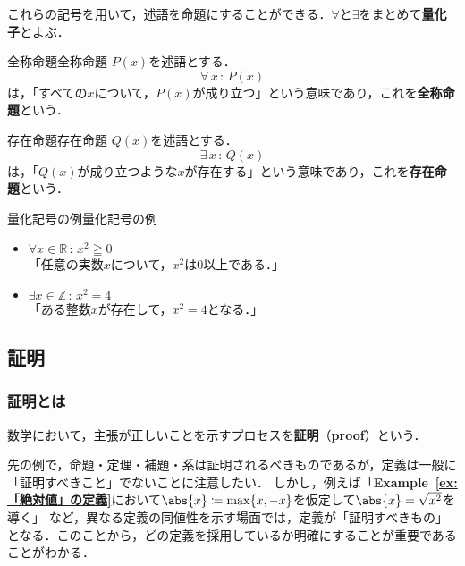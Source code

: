 \documentclass[a4paper,11pt]{ltjsarticle}
\renewcommand{\emph}[1]{\textbf{#1}}
\newcommand{\exref}[1]{\textsf{\bfseries Example~\ref{ex:#1}}}
\renewcommand{\geq}{\geqq}
\begin{document}
これらの記号を用いて，述語を命題にすることができる．$\forall$と$\exists$をまとめて\emph{量化子}とよぶ．

\begin{definition}{全称命題}{全称命題}
  $P(x)$を述語とする．
  \[
    \forall\, x \, : \, P(x)
  \]
  は，「すべての$x$について，$P(x)$が成り立つ」という意味であり，これを\emph{全称命題}という．
\end{definition}

\begin{definition}{存在命題}{存在命題}
  $Q(x)$を述語とする．
  \[
    \exists \,  x\, : \, Q(x)
  \]
  は，「$Q(x)$が成り立つような$x$が存在する」という意味であり，これを\emph{存在命題}という．
\end{definition}

\begin{example}{量化記号の例}{量化記号の例}
  \begin{itemize}
    \item $\forall x \in \mathbb{R}\, : \, x^2 \geq 0$\\
          「任意の実数$x$について，$x^2$は$0$以上である．」
    \item $\exists x \in \mathbb{Z} \, : \, x^2 = 4$\\
          「ある整数$x$が存在して，$x^2 = 4$となる．」
  \end{itemize}
\end{example}

\subsection{証明}

\subsubsection{証明とは}
数学において，主張が正しいことを示すプロセスを\emph{証明}（\emph{proof}）という．

先の例で，命題・定理・補題・系は証明されるべきものであるが，定義は一般に「証明すべきこと」でないことに注意したい．
しかし，例えば「\exref{「絶対値」の定義}において$\abs{x} \coloneqq \max \{ x, -x \}$を仮定して$\abs{x} = \sqrt{x^2}$を導く」
など，異なる定義の同値性を示す場面では，定義が「証明すべきもの」となる．このことから，どの定義を採用しているか明確にすることが重要であることがわかる．
\end{document}
